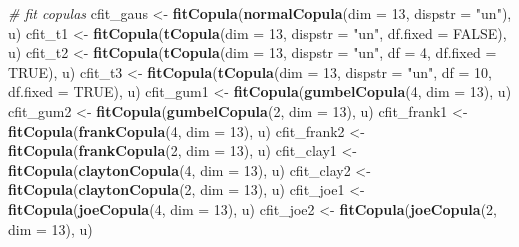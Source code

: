 \documentclass[12pt, twoside]{amherstthesis}
\newenvironment{Shaded}{\begin{snugshade}}{\end{snugshade}}
\newcommand{\AttributeTok}[1]{\textcolor[rgb]{0.13,0.29,0.53}{#1}}
\newcommand{\CommentTok}[1]{\textcolor[rgb]{0.56,0.35,0.01}{\textit{#1}}}
\newcommand{\ConstantTok}[1]{\textcolor[rgb]{0.56,0.35,0.01}{#1}}
\newcommand{\DecValTok}[1]{\textcolor[rgb]{0.00,0.00,0.81}{#1}}
\newcommand{\FunctionTok}[1]{\textcolor[rgb]{0.13,0.29,0.53}{\textbf{#1}}}
\newcommand{\NormalTok}[1]{#1}
\newcommand{\OtherTok}[1]{\textcolor[rgb]{0.56,0.35,0.01}{#1}}
\newcommand{\StringTok}[1]{\textcolor[rgb]{0.31,0.60,0.02}{#1}}
\begin{document}
\begin{Shaded}
\begin{Highlighting}[]
\CommentTok{\# fit copulas}
\NormalTok{cfit\_gaus }\OtherTok{\textless{}{-}} \FunctionTok{fitCopula}\NormalTok{(}\FunctionTok{normalCopula}\NormalTok{(}\AttributeTok{dim =} \DecValTok{13}\NormalTok{, }\AttributeTok{dispstr =} \StringTok{"un"}\NormalTok{), u)}
\NormalTok{cfit\_t1 }\OtherTok{\textless{}{-}} \FunctionTok{fitCopula}\NormalTok{(}\FunctionTok{tCopula}\NormalTok{(}\AttributeTok{dim =} \DecValTok{13}\NormalTok{, }\AttributeTok{dispstr =} \StringTok{"un"}\NormalTok{, }
                             \AttributeTok{df.fixed =} \ConstantTok{FALSE}\NormalTok{), u)}
\NormalTok{cfit\_t2 }\OtherTok{\textless{}{-}} \FunctionTok{fitCopula}\NormalTok{(}\FunctionTok{tCopula}\NormalTok{(}\AttributeTok{dim =} \DecValTok{13}\NormalTok{, }\AttributeTok{dispstr =} \StringTok{"un"}\NormalTok{, }
                             \AttributeTok{df =} \DecValTok{4}\NormalTok{, }\AttributeTok{df.fixed =} \ConstantTok{TRUE}\NormalTok{), u)}
\NormalTok{cfit\_t3 }\OtherTok{\textless{}{-}} \FunctionTok{fitCopula}\NormalTok{(}\FunctionTok{tCopula}\NormalTok{(}\AttributeTok{dim =} \DecValTok{13}\NormalTok{, }\AttributeTok{dispstr =} \StringTok{"un"}\NormalTok{, }
                             \AttributeTok{df =} \DecValTok{10}\NormalTok{, }\AttributeTok{df.fixed =} \ConstantTok{TRUE}\NormalTok{), u)}
\NormalTok{cfit\_gum1 }\OtherTok{\textless{}{-}} \FunctionTok{fitCopula}\NormalTok{(}\FunctionTok{gumbelCopula}\NormalTok{(}\DecValTok{4}\NormalTok{, }\AttributeTok{dim =} \DecValTok{13}\NormalTok{), u)}
\NormalTok{cfit\_gum2 }\OtherTok{\textless{}{-}} \FunctionTok{fitCopula}\NormalTok{(}\FunctionTok{gumbelCopula}\NormalTok{(}\DecValTok{2}\NormalTok{, }\AttributeTok{dim =} \DecValTok{13}\NormalTok{), u)}
\NormalTok{cfit\_frank1 }\OtherTok{\textless{}{-}} \FunctionTok{fitCopula}\NormalTok{(}\FunctionTok{frankCopula}\NormalTok{(}\DecValTok{4}\NormalTok{, }\AttributeTok{dim =} \DecValTok{13}\NormalTok{), u)}
\NormalTok{cfit\_frank2 }\OtherTok{\textless{}{-}} \FunctionTok{fitCopula}\NormalTok{(}\FunctionTok{frankCopula}\NormalTok{(}\DecValTok{2}\NormalTok{, }\AttributeTok{dim =} \DecValTok{13}\NormalTok{), u)}
\NormalTok{cfit\_clay1 }\OtherTok{\textless{}{-}} \FunctionTok{fitCopula}\NormalTok{(}\FunctionTok{claytonCopula}\NormalTok{(}\DecValTok{4}\NormalTok{, }\AttributeTok{dim =} \DecValTok{13}\NormalTok{), u)}
\NormalTok{cfit\_clay2 }\OtherTok{\textless{}{-}} \FunctionTok{fitCopula}\NormalTok{(}\FunctionTok{claytonCopula}\NormalTok{(}\DecValTok{2}\NormalTok{, }\AttributeTok{dim =} \DecValTok{13}\NormalTok{), u)}
\NormalTok{cfit\_joe1 }\OtherTok{\textless{}{-}} \FunctionTok{fitCopula}\NormalTok{(}\FunctionTok{joeCopula}\NormalTok{(}\DecValTok{4}\NormalTok{, }\AttributeTok{dim =} \DecValTok{13}\NormalTok{), u)}
\NormalTok{cfit\_joe2 }\OtherTok{\textless{}{-}} \FunctionTok{fitCopula}\NormalTok{(}\FunctionTok{joeCopula}\NormalTok{(}\DecValTok{2}\NormalTok{, }\AttributeTok{dim =} \DecValTok{13}\NormalTok{), u)}


\end{Highlighting}
\end{Shaded}
\end{document}
